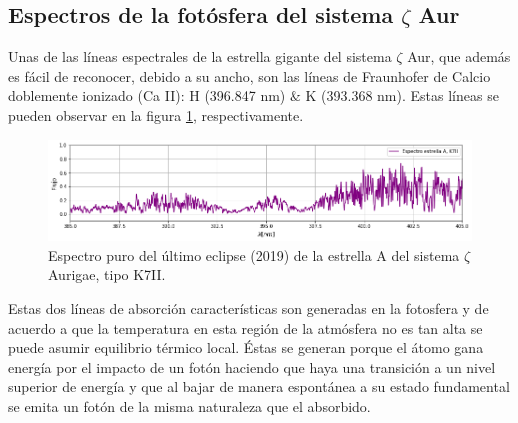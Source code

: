 \documentclass[12pt,oneside,openany,letter]{book}
\begin{document}

\subsection*{Espectros de la fotósfera del  sistema $\zeta$ Aur}\label{ssec:lineasfoto}

Unas de las líneas espectrales de la estrella gigante del sistema $\zeta$ Aur, que además es fácil de reconocer, debido a su ancho, son las líneas de Fraunhofer de Calcio doblemente ionizado (Ca II): H (396.847 nm) $\&$ K (393.368 nm). Estas líneas se pueden observar en la figura \ref{fig:lineafotos}, respectivamente.

\begin{figure}[h]
    \centering
    \includegraphics[width=1\linewidth]{Images/Lineas_fotosfera.png}
    \caption{Espectro puro del último eclipse (2019) de la estrella A del sistema $\zeta$ Aurigae, tipo K7II.}
    \label{fig:lineafotos}
\end{figure}


Estas dos líneas de absorción características son generadas en la fotosfera y de acuerdo a que la temperatura en esta región de la atmósfera no es tan alta se puede asumir equilibrio térmico local. Éstas se generan porque el átomo gana energía por el impacto de un fotón haciendo que haya una transición a un nivel superior de energía y que al bajar de manera espontánea a su estado fundamental se emita un fotón de la misma naturaleza que el absorbido. 
\end{document}
